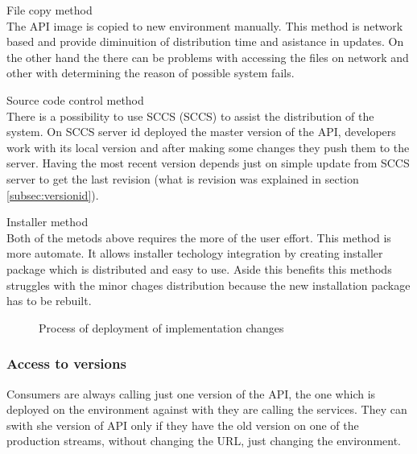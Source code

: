 \begin{description}
  \item{File copy method} \hfill \\
  The API image is copied to new environment manually. This method is network based and provide diminuition of distribution time and asistance in updates. On the other hand the there can be problems with accessing the files on network and other with determining the reason of possible system fails. 
  \item{Source code control method} \hfill \\
  There is a possibility to use \gls{SCCS} (SCCS) to assist the distribution of the system. On SCCS server id deployed the master version of the API, developers work with its local version and after making some changes they push them to the server. Having the most recent version depends just on simple update from SCCS server to get the last revision (what is revision was explained in section \ref{subsec:versionid}). 
  \item{Installer method} \hfill \\
  Both of the metods above requires the more of the user effort. This method is more automate. It allows installer techology integration by creating installer package which is distributed and easy to use. Aside this benefits this methods struggles with the minor chages distribution because the new installation package has to be rebuilt.
\end{description}


\begin{figure}[htp] 
\caption{Process of deployment of implementation changes}
\label{fig:service-implementation}
\end{figure} 

\subsubsection{Access to versions}
Consumers are always calling just one version of the API, the one which is deployed on the environment against with they are calling the services. They can swith she version of API only if they have the old version on one of the production streams, without changing the URL, just changing the environment. 

